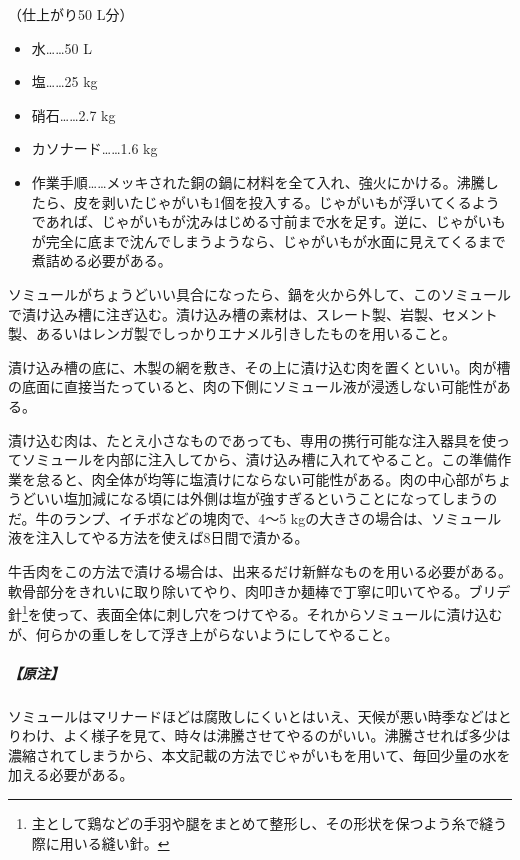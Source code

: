 \begin{recette}
（仕上がり50 L分）

\begin{itemize}
\tightlist
\item
  水\ldots{}\ldots{}50 L
\item
  塩\ldots{}\ldots{}25 kg
\item
  硝石\ldots{}\ldots{}2.7 kg
\item
  カソナード\ldots{}\ldots{}1.6 kg
\item
  作業手順\ldots{}\ldots{}メッキされた銅の鍋に材料を全て入れ、強火にかける。沸騰したら、皮を剥いたじゃがいも1個を投入する。じゃがいもが浮いてくるようであれば、じゃがいもが沈みはじめる寸前まで水を足す。逆に、じゃがいもが完全に底まで沈んでしまうようなら、じゃがいもが水面に見えてくるまで煮詰める必要がある。
\end{itemize}

ソミュールがちょうどいい具合になったら、鍋を火から外して、このソミュールで漬け込み槽に注ぎ込む。漬け込み槽の素材は、スレート製、岩製、セメント製、あるいはレンガ製でしっかりエナメル引きしたものを用いること。

漬け込み槽の底に、木製の網を敷き、その上に漬け込む肉を置くといい。肉が槽の底面に直接当たっていると、肉の下側にソミュール液が浸透しない可能性がある。

漬け込む肉は、たとえ小さなものであっても、専用の携行可能な注入器具を使ってソミュールを内部に注入してから、漬け込み槽に入れてやること。この準備作業を怠ると、肉全体が均等に塩漬けにならない可能性がある。肉の中心部がちょうどいい塩加減になる頃には外側は塩が強すぎるということになってしまうのだ。牛のランプ、イチボなどの塊肉で、4〜5
kgの大きさの場合は、ソミュール液を注入してやる方法を使えば8日間で漬かる。

牛舌肉をこの方法で漬ける場合は、出来るだけ新鮮なものを用いる必要がある。軟骨部分をきれいに取り除いてやり、肉叩きか麺棒で丁寧に叩いてやる。ブリデ針\footnote{主として鶏などの手羽や腿をまとめて整形し、その形状を保つよう糸で縫う際に用いる縫い針。}を使って、表面全体に刺し穴をつけてやる。それからソミュールに漬け込むが、何らかの重しをして浮き上がらないようにしてやること。

\hypertarget{observation-grande-saumure}{%
\subparagraph{【原注】}\label{observation-grande-saumure}}

ソミュールはマリナードほどは腐敗しにくいとはいえ、天候が悪い時季などはとりわけ、よく様子を見て、時々は沸騰させてやるのがいい。沸騰させれば多少は濃縮されてしまうから、本文記載の方法でじゃがいもを用いて、毎回少量の水を加える必要がある。
\end{recette}